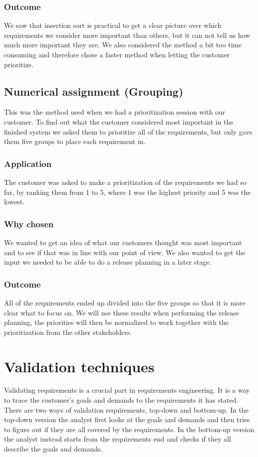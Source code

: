 \documentclass[a4paper]{article}
\begin{document}
		\subsubsection{Outcome}
			We saw that insertion sort is practical to get a clear picture over which requirements we consider more important than others, but it can not tell us how much more important they are. We also considered the method a bit too time consuming and therefore chose a faster method when letting the customer prioritize.  			
		
	\subsection{Numerical assignment (Grouping)}
		This was the method used when we had a prioritization session with our customer.
		To find out what the customer considered most important in the finished system we asked them to prioritize all of the requirements, but only gave them five groups to place each requirement in.
		\subsubsection{Application}
			The customer was asked to make a prioritization of the requirements we had so far, by ranking them from 1 to 5, where 1 was the highest priority and 5 was the lowest.
		\subsubsection{Why chosen}
			We wanted to get an idea of what our customers thought was most important and to see if that was in line with our point of view. We also wanted to get the input we needed to be able to do a release planning in a later stage.
		\subsubsection{Outcome}
			All of the requirements ended up divided into the five groups so that it is more clear what to focus on. We will use these results when performing the release planning, the priorities will then be normalized to work together with the prioritization from the other stakeholders.

	\section{Validation techniques}
	Validating requirements is a crucial part in requirements engineering. It is a way to trace the customer's goals and demands to the requirements it has stated. There are two ways of validation requirements, top-down and bottom-up. In the top-down version the analyst first looks at the goals and demands and then tries to figure out if they are all covered by the requirements. In the bottom-up version the analyst instead starts from the requirements end and checks if they all describe the goals and demands.
						
\end{document}
